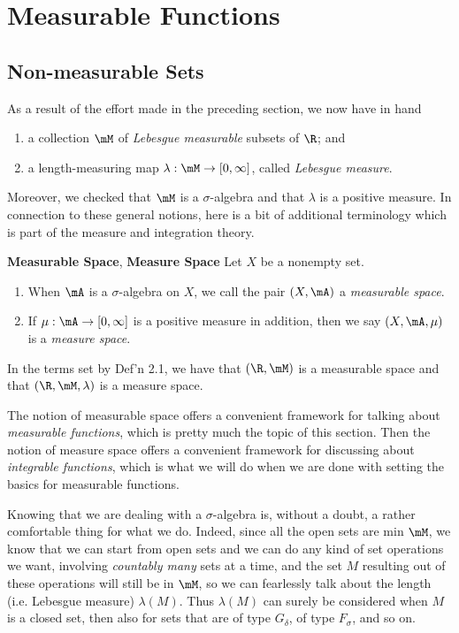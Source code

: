 \documentclass[pmath450]{subfiles}
\begin{document}
    \section{Measurable Functions}

    \subsection{Non-measurable Sets}

    As a result of the effort made in the preceding section, we now have in hand
    \begin{enumerate}
        \item a collection $\mM$ of \textit{Lebesgue measurable} subsets of $\R$; and
        \item a length-measuring map $\lambda:\mM\to\left[ 0,\infty \right]$, called \textit{Lebesgue measure}.
    \end{enumerate}
    Moreover, we checked that $\mM$ is a $\sigma$-algebra and that $\lambda$ is a positive measure. In connection to these general notions, here is a bit of additional terminology which is part of the measure and integration theory.

    \begin{definition}{\textbf{Measurable Space}, \textbf{Measure Space}}
        Let $X$ be a nonempty set.
        \begin{enumerate}
            \item When $\mA$ is a $\sigma$-algebra on $X$, we call the pair $\left( X,\mA \right)$ a \emph{measurable space}.
            \item If $\mu:\mA\to\left[ 0,\infty \right]$ is a positive measure in addition, then we say $\left( X,\mA,\mu \right)$ is a \emph{measure space}.
        \end{enumerate}
    \end{definition}

    \np In the terms set by Def'n 2.1, we have that $\left( \R,\mM \right)$ is a measurable space and that $\left( \R,\mM,\lambda \right)$ is a measure space.

    The notion of measurable space offers a convenient framework for talking about \textit{measurable functions}, which is pretty much the topic of this section. Then the notion of measure space offers a convenient framework for discussing about \textit{integrable functions}, which is what we will do when we are done with setting the basics for measurable functions.

    \np Knowing that we are dealing with a $\sigma$-algebra is, without a doubt, a rather comfortable thing for what we do. Indeed, since all the open sets are min $\mM$, we know that we can start from open sets and we can do any kind of set operations we want, involving \textit{countably many} sets at a time, and the set $M$ resulting out of these operations will still be in $\mM$, so we can fearlessly talk about the length (i.e. Lebesgue measure) $\lambda\left( M \right)$. Thus $\lambda\left( M \right)$ can surely be considered when $M$ is a closed set, then also for sets that are of type $G_{\delta}$, of type $F_{\sigma}$, and so on.
\end{document}

